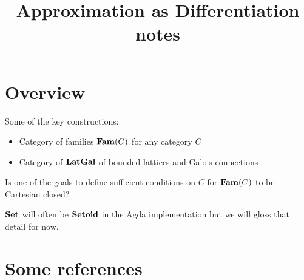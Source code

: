 \documentclass[acmsmall,nonacm]{acmart}
\begin{document}
\title{Approximation as Differentiation notes}
\maketitle

\section{Overview}

Some of the key constructions:
\begin{itemize}
\item Category of families $\mathbf{Fam}(C)$ for any category $C$
\item Category of $\mathbf{LatGal}$ of bounded lattices and Galois connections
\end{itemize}

Is one of the goals to define sufficient conditions on $C$ for $\mathbf{Fam}(C)$ to be Cartesian closed?

\noindent $\mathbf{Set}$ will often be $\mathbf{Setoid}$ in the Agda implementation but we will gloss that detail for now.


% 

\section{Some references}

\cite{karvonen2020}



\end{document}
